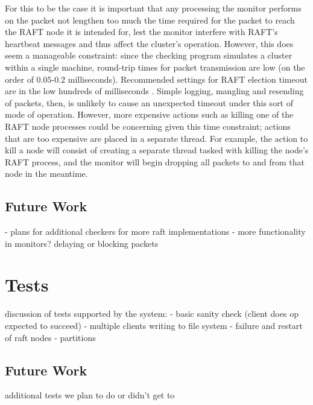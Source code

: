 \documentclass[UTF8]{article}
\begin{document}
For this to be the case it is important that any processing the monitor performs on the packet not lengthen too much the time required for the packet to reach the RAFT node it is intended for, lest the monitor interfere with RAFT's heartbeat messages and thus affect the cluster's operation. However, this does seem a manageable constraint: since the checking program simulates a cluster within a single machine, round-trip times for packet transmission are low (on the order of $0.05$-$0.2$ milliseconds). Recommended settings for RAFT election timeout are in the low hundreds of milliseconds \cite{raftPaper}. Simple logging, mangling and resending of packets, then, is unlikely to cause an unexpected timeout under this sort of mode of operation. However, more expensive actions such as killing one of the RAFT node processes could be concerning given this time constraint; actions that are too expensive are placed in a separate thread. For example, the action to kill a node will consist of creating a separate thread tasked with killing the node's RAFT process, and the monitor will begin dropping all packets to and from that node in the meantime.

\subsection{Future Work}

- plans for additional checkers for more raft implementations
- more functionality in monitors? delaying or blocking packets

\section{Tests}

discussion of tests supported by the system:
- basic sanity check (client does op expected to succeed)
- multiple clients writing to file system
- failure and restart of raft nodes
- partitions

\subsection{Future Work}

additional tests we plan to do or didn't get to




\end{document}
